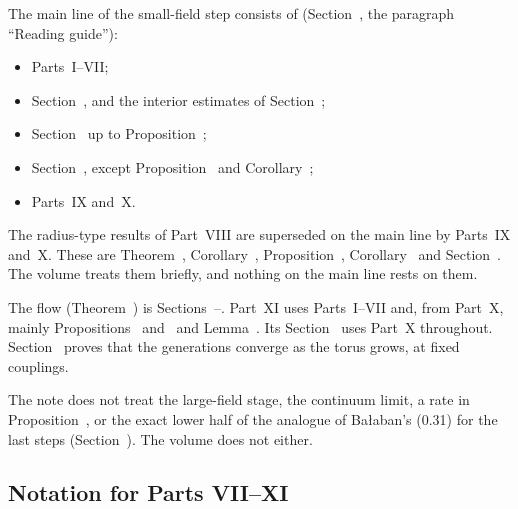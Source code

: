 The main line of the small-field step consists of (Section~, the paragraph ``Reading guide''):
\begin{itemize}
\item Parts~I--VII;
\item Section~, and the interior estimates of Section~;
\item Section~ up to Proposition~;
\item Section~, except Proposition~ and Corollary~;
\item Parts~IX and~X.
\end{itemize}
The radius-type results of Part~VIII are superseded on the main line by Parts~IX and~X. These are Theorem~, Corollary~, Proposition~, Corollary~ and Section~. The volume treats them briefly, and nothing on the main line rests on them.

The flow (Theorem~) is Sections~--. Part~XI uses Parts~I--VII and, from Part~X, mainly Propositions~ and~ and Lemma~. Its Section~ uses Part~X throughout. Section~ proves that the generations converge as the torus grows, at fixed couplings.

The note does not treat the large-field stage, the continuum limit, a rate in Proposition~, or the exact lower half of the analogue of Ba\l aban's (0.31) for the last steps (Section~). The volume does not either.

\subsection{Notation for Parts VII--XI}\label{subsec:guide-notation}

